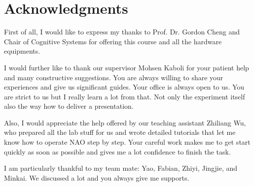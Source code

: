 \documentclass[ICS, PP, english, final]{ICS_thesis}
\begin{document}
\pagestyle{fancy}

\tableofcontents






% 	

\cleardoublepage
\chapter*{Acknowledgments}
First of all, I would like to express my thanks to Prof. Dr. Gordon Cheng and Chair of Cognitive Systems for offering this course and all the hardware equipments.

I would further like to thank our supervisor Mohsen Kaboli for your patient help and many constructive suggestions. You are always willing to share your experiences and give us significant guides. Your office is always open to us. You are strict to us but I really learn a lot from that. Not only the experiment itself also the way how to deliver a presentation.

Also, I would appreciate the help offered by our teaching assistant Zhiliang Wu, who prepared all the lab stuff for us and wrote detailed tutorials that let me know how to operate NAO step by step. Your careful work makes me to get start quickly as soon as possible and gives me a lot confidence to finish the task. 

I am particularly thankful to my team mate: Yao, Fabian, Zhiyi, Jingjie, and Minkai. We discussed a lot and you always give me supports.

\cleardoublepage
{}
\listoffigures

% 

\cleardoublepage
{}



\end{document}
